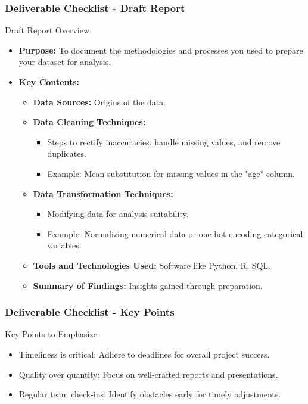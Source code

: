 \documentclass[aspectratio=169]{beamer}
\begin{document}
\begin{frame}[fragile]
    \frametitle{Deliverable Checklist - Draft Report}
    \begin{block}{Draft Report Overview}
        \begin{itemize}
            \item \textbf{Purpose:} To document the methodologies and processes you used to prepare your dataset for analysis.
            \item \textbf{Key Contents:}
            \begin{itemize}
                \item \textbf{Data Sources:} Origins of the data.
                \item \textbf{Data Cleaning Techniques:} 
                \begin{itemize}
                    \item Steps to rectify inaccuracies, handle missing values, and remove duplicates.
                    \item Example: Mean substitution for missing values in the "age" column.
                \end{itemize}
                \item \textbf{Data Transformation Techniques:} 
                \begin{itemize}
                    \item Modifying data for analysis suitability.
                    \item Example: Normalizing numerical data or one-hot encoding categorical variables.
                \end{itemize}
                \item \textbf{Tools and Technologies Used:} Software like Python, R, SQL.
                \item \textbf{Summary of Findings:} Insights gained through preparation.
            \end{itemize}
        \end{itemize}
    \end{block}
\end{frame}

\begin{frame}[fragile]
    \frametitle{Deliverable Checklist - Key Points}
    \begin{block}{Key Points to Emphasize}
        \begin{itemize}
            \item Timeliness is critical: Adhere to deadlines for overall project success.
            \item Quality over quantity: Focus on well-crafted reports and presentations.
            \item Regular team check-ins: Identify obstacles early for timely adjustments.
        \end{itemize}
    \end{block}
\end{frame}
\end{document}
